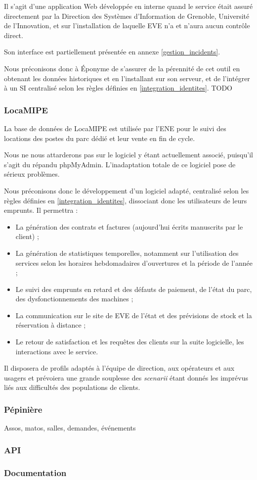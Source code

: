 Il s'agit d'une application Web développée en interne quand le service était
assuré directement par la Direction des Systèmes d'Information de Grenoble,
Université de l'Innovation, et sur l'installation de laquelle EVE n'a et
n'aura aucun contrôle direct.

Son interface est partiellement présentée en annexe \ref{gestion_incidents}.

Nous préconisons donc à Éponyme de s'assurer de la pérennité de cet outil
en obtenant les données historiques et en l'installant sur son serveur,
et de l'intégrer à un SI centralisé selon les règles définies en
\ref{integration_identites}.
TODO \label{integration_identites}

\subsubsection{LocaMIPE}

La base de données de LocaMIPE est utilisée par l'ENE pour le suivi des
locations des postes du parc dédié et leur vente en fin de cycle.

Nous ne nous attarderons pas sur le logiciel y étant actuellement associé,
puisqu'il s'agit du répandu phpMyAdmin. L'inadaptation totale de ce logiciel
pose de sérieux problèmes.

Nous préconisons donc le développement d'un logiciel adapté, centralisé selon
les règles définies en \ref{integration_identites}, dissociant donc les
utilisateurs de leurs emprunts. Il permettra :
\begin{itemize}
\item La génération des contrats et factures (aujourd'hui écrits manuscrits
      par le client) ;
\item La génération de statistiques temporelles, notamment sur l'utilisation
      des services selon les horaires hebdomadaires d'ouvertures et
      la période de l'année ;
\item Le suivi des emprunts en retard et des défauts de paiement, de l'état
      du parc, des dysfonctionnements des machines ;
\item La communication sur le site de EVE de l'état et des prévisions de
      stock et la réservation à distance ;
\item Le retour de satisfaction et les requêtes des clients sur la suite
      logicielle, les interactions avec le service.
\end{itemize}

Il disposera de profils adaptés à l'équipe de direction, aux opérateurs et
aux usagers et prévoiera une grande souplesse des \textit{scenarii} étant
donnés les imprévus liés aux difficultés des populations de clients.

\subsubsection{Pépinière}

Assos, matos, salles, demandes, événements

\subsubsection{API}

\subsubsection{Documentation}
